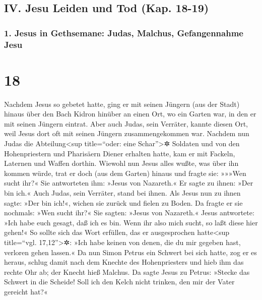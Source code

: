 \hypertarget{iv.-jesu-leiden-und-tod-kap.-18-19}{%
\subsection{IV. Jesu Leiden und Tod (Kap.
18-19)}\label{iv.-jesu-leiden-und-tod-kap.-18-19}}

\hypertarget{jesus-in-gethsemane-judas-malchus-gefangennahme-jesu}{%
\subsubsection{1. Jesus in Gethsemane: Judas, Malchus, Gefangennahme
Jesu}\label{jesus-in-gethsemane-judas-malchus-gefangennahme-jesu}}

\hypertarget{section-17}{%
\section{18}\label{section-17}}

 Nachdem Jesus so gebetet hatte, ging er mit seinen
Jüngern (aus der Stadt) hinaus über den Bach Kidron hinüber an einen
Ort, wo ein Garten war, in den er mit seinen Jüngern eintrat.
 Aber auch Judas, sein Verräter, kannte diesen Ort, weil
Jesus dort oft mit seinen Jüngern zusammengekommen war. 
Nachdem nun Judas die Abteilung\textless sup title=``oder: eine
Schar''\textgreater✲ Soldaten und von den Hohenpriestern und Pharisäern
Diener erhalten hatte, kam er mit Fackeln, Laternen und Waffen dorthin.
 Wiewohl nun Jesus alles wußte, was über ihn kommen würde,
trat er doch (aus dem Garten) hinaus und fragte sie: »»»Wen sucht ihr?«
 Sie antworteten ihm: »Jesus von Nazareth.« Er sagte zu
ihnen: »Der bin ich.« Auch Judas, sein Verräter, stand bei ihnen.
 Als Jesus nun zu ihnen sagte: »Der bin ich!«, wichen sie
zurück und fielen zu Boden.  Da fragte er sie nochmals:
»Wen sucht ihr?« Sie sagten: »Jesus von Nazareth.«  Jesus
antwortete: »Ich habe euch gesagt, daß ich es bin. Wenn ihr also mich
sucht, so laßt diese hier gehen!«  So sollte sich das Wort
erfüllen, das er ausgesprochen hatte\textless sup title=``vgl.
17,12''\textgreater✲: »Ich habe keinen von denen, die du mir gegeben
hast, verloren gehen lassen.«  Da nun Simon Petrus ein
Schwert bei sich hatte, zog er es heraus, schlug damit nach dem Knechte
des Hohenpriesters und hieb ihm das rechte Ohr ab; der Knecht hieß
Malchus.  Da sagte Jesus zu Petrus: »Stecke das Schwert
in die Scheide! Soll ich den Kelch nicht trinken, den mir der Vater
gereicht hat?«

